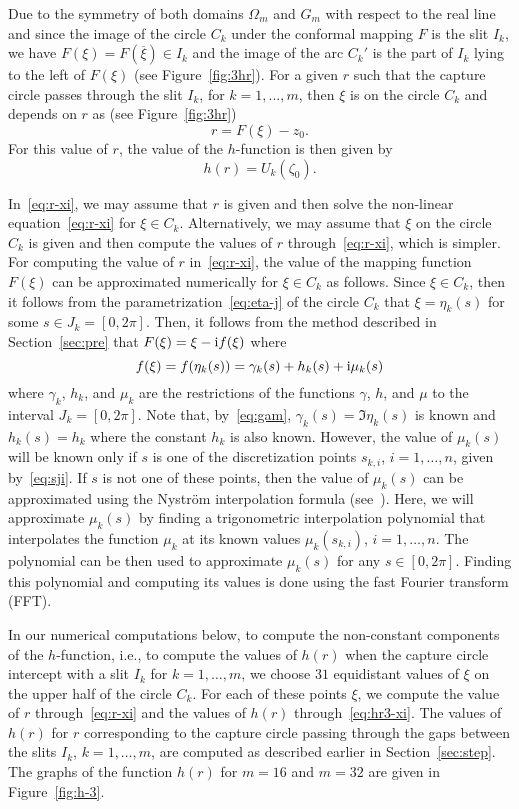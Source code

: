 Due to the symmetry of both domains $\Omega_m$ and $G_m$ with respect to the real line and since the image of the circle $C_k$ under the conformal mapping $F$ is the slit $I_k$, we have $F(\xi)=F(\overline{\xi})\in I_k$ and the image of the arc $C_k'$ is the part of $I_k$ lying to the left of $F(\xi)$ (see Figure~\ref{fig:3hr}). 
For a given $r$ such that the capture circle passes through the slit $I_k$, for $k=1,...,m$, then $\xi$ is on the circle $C_k$ and depends on $r$ as (see Figure~\ref{fig:3hr}) 
\begin{equation}\label{eq:r-xi}
r= F(\xi)-z_0.
\end{equation}
For this value of $r$, the value of the $h$-function is then given by
\begin{equation}\label{eq:hr3-xi}
h(r)=U_k(\zeta_0).
\end{equation}


In~\eqref{eq:r-xi}, we may assume that $r$ is given and then solve the non-linear equation~\eqref{eq:r-xi} for $\xi\in C_k$. Alternatively, we may assume that $\xi$ on the circle $C_k$ is given and then compute the values of $r$ through~\eqref{eq:r-xi}, which is simpler. 
For computing the value of $r$ in~\eqref{eq:r-xi}, the value of the mapping function $F(\xi)$ can be approximated numerically for $\xi\in C_k$ as follows.
Since $\xi\in C_k$, then it follows from the parametrization~\eqref{eq:eta-j} of the circle $C_k$ that $\xi=\eta_k(s)$ for some $s\in J_k=[0,2\pi]$. Then, it follows from the method described in Section~\ref{sec:pre} that $F(\xi)=\xi-\mathrm{i} f(\xi)$ where
\[
f(\xi)=f(\eta_k(s))=\gamma_k(s)+h_k(s)+\mathrm{i}\mu_k(s)
\]
where $\gamma_k$, $h_k$, and $\mu_k$ are the restrictions of the functions $\gamma$, $h$, and $\mu$ to the interval $J_k=[0,2\pi]$. Note that, by~\eqref{eq:gam}, $\gamma_k(s)=\Im\eta_k(s)$ is known and $h_k(s)=h_k$ where the constant $h_k$ is also known. However, the value of $\mu_k(s)$ will be known only if $s$ is one of the discretization points $s_{k,i}$, $i=1,\ldots,n$, given by~\eqref{eq:sji}. If $s$ is not one of these points, then the value of $\mu_k(s)$ can be approximated using the Nystr{\"o}m interpolation formula (see~\cite{Atk97}). Here, we will approximate $\mu_k(s)$ by finding a trigonometric interpolation polynomial that interpolates the function $\mu_k$ at its known values $\mu_k(s_{k,i})$, $i=1,\ldots,n$. The polynomial can be then used to approximate $\mu_k(s)$ for any $s\in[0,2\pi]$. Finding this polynomial and computing its values is done using the fast Fourier transform (FFT).


In our numerical computations below, to compute the non-constant components of the $h$-function, i.e., to compute the values of $h(r)$ when the capture circle intercept with a slit $I_k$ for $k=1,\ldots,m$, we choose $31$ equidistant values of $\xi$ on the upper half of the circle $C_k$. For each of these points $\xi$, we compute the value of $r$ through~\eqref{eq:r-xi} and the values of $h(r)$ through~\eqref{eq:hr3-xi}. 
The values of $h(r)$ for $r$ corresponding to the capture circle passing through the gaps between the slits $I_k$, $k=1,\ldots,m$, are computed as described earlier in Section~\ref{sec:step}.
The graphs of the function $h(r)$ for $m=16$ and $m=32$ are given in Figure~\ref{fig:h-3}.


